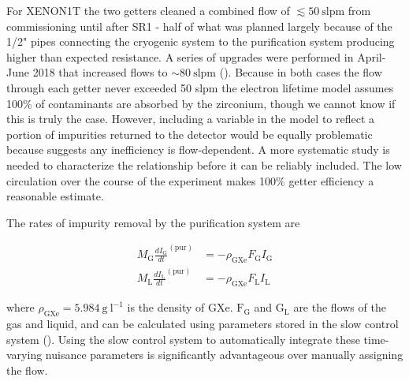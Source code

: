 For XENON1T the two getters cleaned a combined flow of $\lesssim 50\ \mathrm{slpm}$ from commissioning until after SR1 - half of what was
planned largely because of the 1/2" pipes connecting the cryogenic system to the purification system producing higher than expected
resistance.  A series of upgrades were performed in April-June 2018 that increased flows to ${\sim} 80\ \mathrm{slpm}$
().  Because in both cases the flow through each getter never exceeded 50 slpm the electron
lifetime model assumes 100\% of contaminants are absorbed by the zirconium, though we cannot know if this is truly the case.  However,
including a variable in the model to reflect a portion of impurities returned
to the detector would be equally problematic because  suggests any
inefficiency is
flow-dependent.  A more systematic study is needed to characterize the relationship before it can be reliably included.  The low
circulation over the course of the experiment makes 100\% getter efficiency a reasonable estimate.

The rates of impurity removal by the purification system are

\begin{subequations}
\begin{align}
M_{\mathrm{G}} \frac{dI_{\mathrm{G}}}{dt}^{(\mathrm{pur})} &= -\rho_{\mathrm{GXe}} F_{\mathrm{G}} I_{\mathrm{G}}
\label{eq:electron_lifetime_model_removal_gxe}
\\
M_{\mathrm{L}} \frac{dI_{\mathrm{L}}}{dt}^{(\mathrm{pur})} &= -\rho_{\mathrm{GXe}} F_{\mathrm{L}} I_{\mathrm{L}}
\label{eq:electron_lifetime_model_removal_lxe}
\end{align}
\end{subequations}

\noindent where $\rho_{\mathrm{GXe}} = 5.984\ \mathrm{g\ l^{-1}}$ is the density of GXe.  $\mathrm{F_G}$ and $\mathrm{G_L}$ are the flows
of the gas and liquid, and can be calculated using parameters stored in the slow control system
().  Using the slow control system to automatically integrate these time-varying nuisance
parameters is significantly advantageous over manually assigning the flow.

